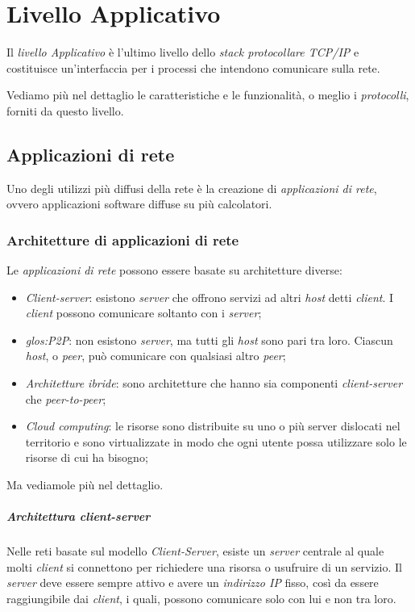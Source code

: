 \chapter{Livello Applicativo}
Il \emph{livello Applicativo} è l’ultimo livello dello \emph{stack protocollare TCP/IP}
e costituisce un’interfaccia per i processi che intendono comunicare sulla rete.

Vediamo più nel dettaglio le caratteristiche e le funzionalità, o meglio i
\emph{protocolli}, forniti da questo livello.

\section{Applicazioni di rete}
Uno degli utilizzi più diffusi della rete è la creazione di \emph{applicazioni di
rete}, ovvero applicazioni software diffuse su più calcolatori.

\subsection{Architetture di applicazioni di rete}
Le \emph{applicazioni di rete} possono essere basate su architetture diverse:
\begin{itemize}
    \item \emph{Client-server}: esistono \emph{server} che offrono servizi ad
    altri \emph{host} detti \emph{client}. I \emph{client} possono
    comunicare soltanto con i \emph{server};
    \item \emph{\gls{glos:P2P}}: non esistono \emph{server}, ma tutti gli
    \emph{host} sono pari tra loro. Ciascun \emph{host}, o \emph{peer}, può
    comunicare con qualsiasi altro \emph{peer};
    \item \emph{Architetture ibride}: sono architetture che hanno sia componenti
    \emph{client-server} che \emph{peer-to-peer};
    \item \emph{Cloud computing}: le risorse sono distribuite su uno o più server
    dislocati nel territorio e sono virtualizzate in modo che ogni utente
    possa utilizzare solo le risorse di cui ha bisogno;
\end{itemize}
Ma vediamole più nel dettaglio.

\paragraph{Architettura client-server}
Nelle reti basate sul modello \emph{Client-Server}, esiste un \emph{server}
centrale al quale molti \emph{client} si connettono per richiedere una risorsa o
usufruire di un servizio. Il \emph{server} deve essere sempre attivo e avere un
\emph{indirizzo IP} fisso, così da essere raggiungibile dai \emph{client}, i
quali, possono comunicare solo con lui e non tra loro.

